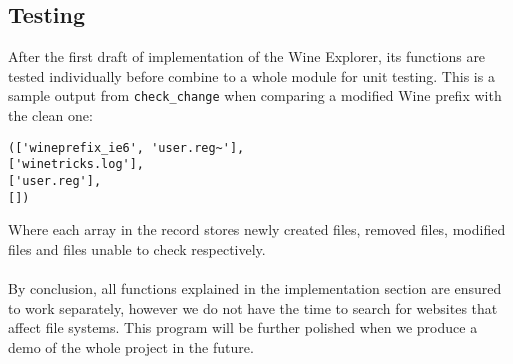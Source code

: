 \subsection{Testing}
After the first draft of implementation of the Wine Explorer, its functions are
tested individually before combine to a whole module for unit testing. This is a sample 
output from \verb'check_change' when comparing a modified Wine prefix with 
the clean one:
\begin{verbatim}
(['wineprefix_ie6', 'user.reg~'], 
['winetricks.log'], 
['user.reg'], 
[])
\end{verbatim}
Where each array in the record stores newly created files, removed files, 
modified files and files unable to check respectively. 
\paragraph{}
By conclusion, all functions 
explained in the implementation section are ensured to work separately, 
however we do not have the time to search for websites that affect file 
systems. This program will be further polished when we produce a demo 
of the whole project in the future. 



